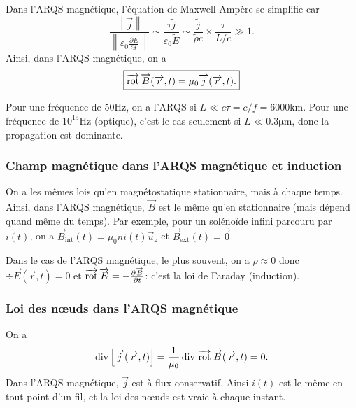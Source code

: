 Dans l'ARQS magnétique, l'équation de Maxwell-Ampère se simplifie car
\begin{equation}
    \frac{\left\lVert\vec{j}\right\rVert}{\left\lVert\varepsilon_0\frac{\partial\vec{E}}{\partial t}\right\rVert}\sim\frac{\tau\tilde{j}}{\varepsilon_0\tilde{E}}\sim\frac{\tilde{j}}{\tilde{\rho}c}\times\frac{\tau}{L/c}\gg 1.
\end{equation}
Ainsi, dans l'ARQS magnétique, on a 
\begin{equation}
    \boxed{
        \operatorname{\overrightarrow{\text{rot}}}\protect\overrightarrow{{B}}(\protect\overrightarrow{{r}},t)=\mu_0\protect\overrightarrow{{j}}(\protect\overrightarrow{{r}},t).
    }
\end{equation}

Pour une fréquence de 50$\si{\hertz}$, on a l'ARQS si $L\ll c\tau=c/f=6000\si{\kilo\metre}$. Pour une fréquence de $10^{15}\si{\hertz}$ (optique), c'est le cas seulement si $L\ll0.3\si{\micro\metre}$, donc la propagation est dominante.

\subsubsection{Champ magnétique dans l'ARQS magnétique et induction}

On a les mêmes lois qu'en magnétostatique stationnaire, mais à chaque temps. Ainsi, dans l'ARQS magnétique, $\vec{B}$ est le même qu'en stationnaire (mais dépend quand même du temps). Par exemple, pour un solénoïde infini parcouru par $i(t)$, on a $\vec{B}_{\mathrm{int}}(t)=\mu_0 ni(t)\vec{u}_z$ et $\vec{B}_{\mathrm{ext}}(t)=\vec{0}$.

Dans le cas de l'ARQS magnétique, le plus souvent, on a $\rho\approx0$ donc $\div\vec{E}(\vec{r},t)=0$ et $\operatorname{\overrightarrow{\text{rot}}}\protect\overrightarrow{{E}}=-\frac{\partial\protect\overrightarrow{{B}}}{\partial t}$: c'est la loi de Faraday (induction).

\subsubsection{Loi des n\oe uds dans l'ARQS magnétique}

On a 
\begin{equation}
    \operatorname{div}\left[\protect\overrightarrow{{j}}(\protect\overrightarrow{{r}},t)\right]=\frac{1}{\mu_0}\operatorname{div}\,\operatorname{\overrightarrow{\text{rot}}}\protect\overrightarrow{{B}}(\protect\overrightarrow{{r}},t)=0.
\end{equation}
Dans l'ARQS magnétique, $\vec{j}$ est à flux conservatif. Ainsi $i(t)$ est le même en tout point d'un fil, et la loi des n\oe uds est vraie à chaque instant.